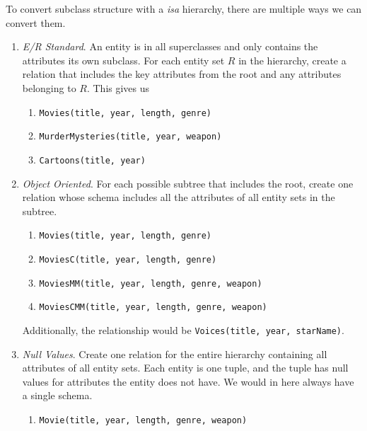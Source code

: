   \begin{theorem}
    \label{thm:converting-subclass-structures}
    To convert subclass structure with a \textit{isa} hierarchy, there are multiple ways we can convert them. 
    \begin{enumerate}
      \item \textit{E/R Standard}. An entity is in all superclasses and only contains the attributes its own subclass. For each entity set $R$ in the hierarchy, create a relation that includes the key attributes from the root and any attributes belonging to $R$. This gives us 
        \begin{enumerate}
          \item \texttt{Movies(title, year, length, genre)}
          \item \texttt{MurderMysteries(title, year, weapon)}
          \item \texttt{Cartoons(title, year)}
        \end{enumerate}
      \item \textit{Object Oriented}. For each possible subtree that includes the root, create one relation whose schema includes all the attributes of all entity sets in the subtree.
        \begin{enumerate}
          \item \texttt{Movies(title, year, length, genre)} 
          \item \texttt{MoviesC(title, year, length, genre)} 
          \item \texttt{MoviesMM(title, year, length, genre, weapon)}
          \item \texttt{MoviesCMM(title, year, length, genre, weapon)}
        \end{enumerate}
        Additionally, the relationship would be \texttt{Voices(title, year, starName)}. 
      \item \textit{Null Values}. Create one relation for the entire hierarchy containing all attributes of all entity sets. Each entity is one tuple, and the tuple has null values for attributes the entity does not have. We would in here always have a single schema. 
        \begin{enumerate}
          \item \texttt{Movie(title, year, length, genre, weapon)}
        \end{enumerate}
    \end{enumerate}
  \end{theorem}

